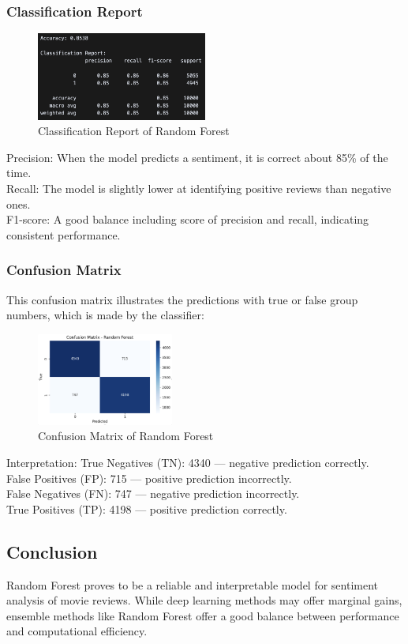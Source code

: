 \subsubsection{Classification Report}
\begin{figure}[ht]
    \centering
    \includegraphics[width=0.5\textwidth]{pics/rf_eval_report_with_acc.png}
    \caption{Classification Report of Random Forest}
\end{figure}

Precision: When the model predicts a sentiment, it is correct about 85\% of the time. \\
Recall: The model is slightly lower at identifying positive reviews than negative ones. \\
F1-score: A good balance including score of precision and recall, indicating consistent performance.

\subsubsection{Confusion Matrix}
This confusion matrix illustrates the predictions with true or false group numbers, which is made by the classifier:

\begin{figure}[ht]
    \centering
    \includegraphics[width=0.4\textwidth]{pics/rf_eval_metrix.png}
    \caption{Confusion Matrix of Random Forest}
\end{figure}

Interpretation:
True Negatives (TN): 4340 — negative prediction correctly. \\
False Positives (FP): 715 — positive prediction incorrectly. \\
False Negatives (FN): 747 — negative prediction incorrectly. \\
True Positives (TP): 4198 — positive prediction correctly.

\subsection{Conclusion}
Random Forest proves to be a reliable and interpretable model for sentiment analysis of movie reviews. While deep learning methods may offer marginal gains, ensemble methods like Random Forest offer a good balance between performance and computational efficiency.


